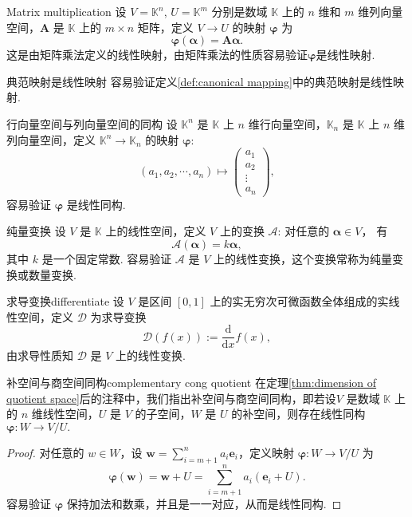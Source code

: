 \documentclass[12pt, a4paper,newtx]{ctexart}
\begin{document}
\begin{example}{}{Matrix multiplication}
	设 $V = \mathbb{K}^n$, $U = \mathbb{K}^m$ 分别是数域 $\mathbb{K}$ 上的 $n$ 维和 $m$ 维列向量空间，$\bm A$ 是 $\mathbb{K}$ 上的 $m \times n$ 矩阵，定义 $V \to U$ 的映射 $\bm\varphi$ 为
	\[
	\bm\varphi(\bm\alpha) = \bm{A\bm\alpha}.
	\]
	这是由矩阵乘法定义的线性映射，由矩阵乘法的性质容易验证$\bm\varphi$是线性映射. 
\end{example}
\begin{example}{典范映射是线性映射}{}
	容易验证定义\ref{def:canonical mapping}中的典范映射是线性映射. 
\end{example}
\begin{example}{行向量空间与列向量空间的同构}{}
	设 $\mathbb{K}^n$ 是 $\mathbb{K}$ 上 $n$ 维行向量空间，$\mathbb{K}_n$ 是 $\mathbb{K}$ 上 $n$ 维列向量空间，定义 $\mathbb{K}^n \rightarrow \mathbb{K}_n$ 的映射 $\bm\varphi$:
	\[
	(a_1, a_2, \cdots, a_n) \mapsto \begin{pmatrix}
		a_1 \\
		a_2 \\
		\vdots \\
		a_n
	\end{pmatrix},
	\]
	容易验证 $\bm\varphi$ 是线性同构. 
\end{example}
\begin{example}{纯量变换}{}
	设 $V$ 是 $\mathbb{K}$ 上的线性空间，定义 $V$ 上的变换 $\mathcal A$: 对任意的 $\bm\alpha \in V$，
	有
	\[
	\mathcal A(\bm\alpha) = k\bm\alpha,
	\]
	其中 $k$ 是一个固定常数. 容易验证 $\mathcal A$ 是 $V$ 上的线性变换，这个变换常称为{\heiti 纯量变换}或数量变换. 
\end{example}
\begin{example}{求导变换}{differentiate}
	设 $V$ 是区间 $[0,1]$ 上的实无穷次可微函数全体组成的实线性空间，定义 $\mathcal D$ 为求导变换
	\[
	\mathcal D(f(x)) := \frac{\mathrm d}{\mathrm dx}f(x),
	\]
	由求导性质知 $\mathcal D$ 是 $V$ 上的线性变换. 
\end{example}
\begin{proposition}{补空间与商空间同构}{complementary cong quotient}
	在定理\ref{thm:dimension of quotient space}后的注释中，我们指出补空间与商空间同构，即若设$V$ 是数域 $\mathbb K$ 上的 $n$ 维线性空间，$U$ 是 $V$ 的子空间，$W$ 是 $U$ 的补空间，则存在线性同构 $\bm\varphi : W \rightarrow V / U.$
\end{proposition}
\begin{proof}
	对任意的 $w \in W$，设 $\displaystyle\bm w = \sum_{i=m+1}^{n} a_i\bm e_i$，定义映射 $\bm\varphi: W \rightarrow V/U$ 为
	\[
	\bm\varphi(\bm w) = \bm w + U = \sum_{i=m+1}^{n} a_i (\bm e_i + U). 
	\]
	容易验证 $\bm{\varphi}$ 保持加法和数乘，并且是一一对应，从而是线性同构. 
\end{proof}
\end{document}
